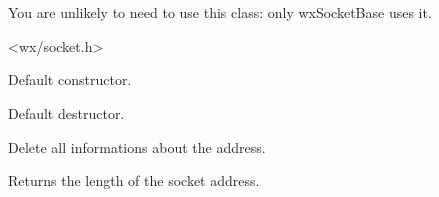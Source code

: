 \section{}\label{wxsockaddress}

You are unlikely to need to use this class: only wxSocketBase uses it.




<wx/socket.h>




%
%
\label{wxsockaddressctor}


Default constructor.

\label{wxsockaddressdtor}


Default destructor.

%
%
\label{wxsockaddressclear}


Delete all informations about the address.

%
%
\label{wxsockaddresssockaddrlen}


Returns the length of the socket address.

